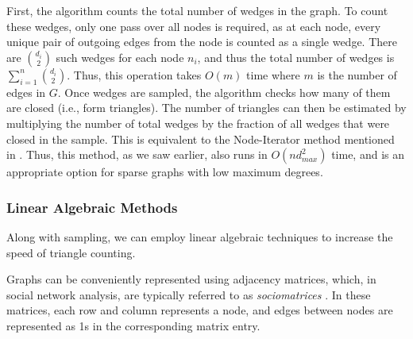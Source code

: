\documentclass[11pt, margin=1in]{article}
\begin{document}
First, the algorithm counts the total number of wedges in the graph.
To count these wedges, only one pass over all nodes is required, as at each node, every unique pair of outgoing edges from the node is counted as a single wedge.
There are $\binom{d_i}{2}$ such wedges for each node $n_i$, and thus the total number of wedges is $\sum_{i = 1}^{n}\binom{d_i}{2}$.
Thus, this operation takes $O(m)$ time where $m$ is the number of edges in $G$.
Once wedges are sampled, the algorithm checks how many of them are closed (i.e., form triangles).
The number of triangles can then be estimated by multiplying the number of total wedges by the fraction of all wedges that were closed in the sample.
This is equivalent to the Node-Iterator method mentioned in .
Thus, this method, as we saw earlier, also runs in $O(nd_{max}^2)$ time, and is an appropriate option for sparse graphs with low maximum degrees.

\subsubsection{Linear Algebraic Methods}

Along with sampling, we can employ linear algebraic techniques to increase the speed of triangle counting.

Graphs can be conveniently represented using adjacency matrices, which, in social network analysis, are typically referred to as \emph{sociomatrices} \cite{beum_method_1950}. 
In these matrices, each row and column represents a node, and edges between nodes are represented as 1s in the corresponding matrix entry.
\end{document}
